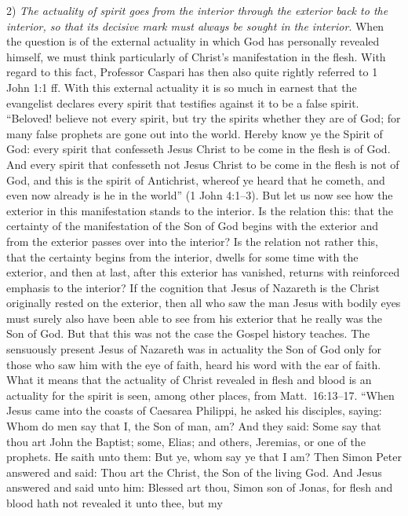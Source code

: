 \documentclass[12pt]{book}
\newcommand{\opage}[1]{\marginnote{\footnotesize\textit{[#1]}}}
\begin{document}
2) \emph{The actuality of spirit goes from the interior through the
exterior back to the interior, so that its decisive mark must always be
sought in the interior}. When the question is of the external actuality in
which God has personally revealed himself, we must think particularly of
Christ's manifestation in the flesh. With regard to this fact, Professor
Caspari has then also quite rightly referred to 1 John 1:1 ff. With this
external actuality it is so much in earnest that the evangelist declares
every spirit that testifies against it to be a false spirit. ``Beloved!
believe not every spirit, but try the spirits whether they are of God;
for many false prophets are gone out into the world. Hereby know ye the
Spirit of God: every spirit that confesseth Jesus Christ to be come in the
flesh is of God. And every spirit that confesseth not Jesus Christ to be
come in the flesh is not of God, and this is the spirit of Antichrist,
whereof ye heard that he cometh, and even now already is he in the
world'' (1 John 4:1--3). But let us now see how the exterior in this
manifestation stands to the interior. Is the relation this: that the
certainty of the manifestation of the Son of God begins with the exterior
and from the exterior passes over into the interior? Is the relation
\opage{305}\setcounter{footnote}{0}%
not rather this, that the certainty begins from the interior, dwells for
some time with the exterior, and then at last, after this exterior has
vanished, returns with reinforced emphasis to the interior? If the
cognition that Jesus of Nazareth is the Christ originally rested on the
exterior, then
all who saw the man Jesus with bodily eyes must surely also have been able
to see from his exterior that he really was the Son of God. But that this
was not the case the Gospel history teaches. The sensuously present Jesus
of Nazareth was in actuality the Son of God only for those who saw him
with the eye of faith, heard his word with the ear of faith. What it means
that the actuality of Christ revealed in flesh and blood is an actuality
for the spirit is seen, among other places, from Matt.\ 16:13--17. ``When
Jesus came into the coasts of Caesarea Philippi, he asked his disciples,
saying: Whom do men say that I, the Son of man, am? And they said: Some
say that thou art John the Baptist; some, Elias; and others, Jeremias, or
one of the prophets. He saith unto them: But ye, whom say ye that I am?
Then Simon Peter answered and said: Thou art the Christ, the Son of the
living God. And Jesus answered and said unto him: Blessed art thou, Simon
son of Jonas, for flesh and blood hath not revealed it unto thee, but my
\end{document}
